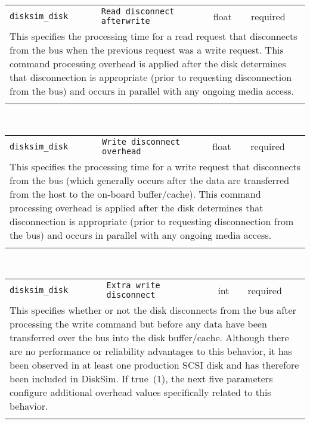 \noindent 
\begin{tabular}{|p{1.5in}|p{3.5in}|p{0.5in}|p{0.5in}|}
\cline{1-4}
\texttt{disksim\_disk} & \texttt{Read disconnect afterwrite} & float & required \\ 
\cline{1-4}
\multicolumn{4}{|p{6in}|}{
This specifies the processing time for a read request that disconnects
from the bus when the previous request was a write request. This
command processing overhead is applied after the disk determines that
disconnection is appropriate (prior to requesting disconnection from
the bus) and occurs in parallel with any ongoing media access.
}\\ 
\cline{1-4}
\multicolumn{4}{p{5in}}{}\\
\end{tabular}\\ 
\noindent 
\begin{tabular}{|p{1.5in}|p{3.5in}|p{0.5in}|p{0.5in}|}
\cline{1-4}
\texttt{disksim\_disk} & \texttt{Write disconnect overhead} & float & required \\ 
\cline{1-4}
\multicolumn{4}{|p{6in}|}{
This specifies the processing time for a write request that disconnects
from the bus (which generally occurs after the data are transferred
from the host to the on-board buffer/cache). This command processing
overhead is applied after the disk determines that disconnection is
appropriate (prior to requesting disconnection from the bus) and
occurs in parallel with any ongoing media access.
}\\ 
\cline{1-4}
\multicolumn{4}{p{5in}}{}\\
\end{tabular}\\ 
\noindent 
\begin{tabular}{|p{1.5in}|p{3.5in}|p{0.5in}|p{0.5in}|}
\cline{1-4}
\texttt{disksim\_disk} & \texttt{Extra write disconnect} & int & required \\ 
\cline{1-4}
\multicolumn{4}{|p{6in}|}{
This specifies whether or not the disk disconnects from the bus after
processing the write command but before any data have been transferred
over the bus into the disk buffer/cache. Although there are no
performance or reliability advantages to this behavior, it has been
observed in at least one production SCSI disk and has therefore been
included in DiskSim. If true~(1), the next five parameters configure
additional overhead values specifically related to this behavior.
}\\ 
\cline{1-4}
\multicolumn{4}{p{5in}}{}\\
\end{tabular}\\ 
